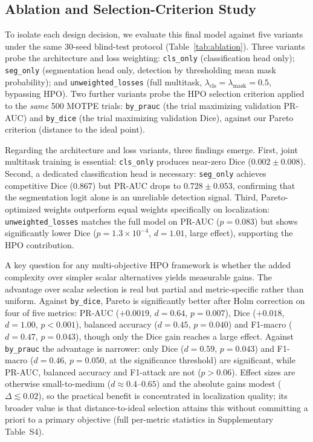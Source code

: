 \documentclass[final,5p,times,twocolumn,number]{elsarticle}
\newcommand{\rev}[1]{#1}
\newcommand{\revB}[1]{#1}
\begin{document}
\subsection{Ablation and Selection-Criterion Study}
\label{subsec:ablation}

To isolate each design decision, we evaluate this final model against five
variants under the same 30-seed blind-test protocol
(Table~\ref{tab:ablation}). Three variants probe the architecture and loss
weighting: \texttt{cls\_only} (classification head only); \texttt{seg\_only}
(segmentation head only, detection by thresholding mean mask probability);
and \texttt{unweighted\_losses} (full multitask, $\lambda_{\text{cls}} =
\lambda_{\text{mask}} = 0.5$, bypassing HPO). \rev{Two further variants probe
the HPO selection criterion applied to the \emph{same} 500 MOTPE trials:
\texttt{by\_prauc} (the trial maximizing validation PR-AUC) and
\texttt{by\_dice} (the trial maximizing validation Dice), against our Pareto
criterion (distance to the ideal point).}

Regarding the architecture and loss variants, three findings emerge.
First, joint multitask training is essential:
\texttt{cls\_only} produces near-zero Dice ($0.002 \pm 0.008$). Second, a
dedicated classification head is necessary: \texttt{seg\_only} achieves
competitive Dice ($0.867$) but PR-AUC drops to $0.728 \pm 0.053$, confirming
that the segmentation logit alone is an unreliable detection signal. Third,
Pareto-optimized weights outperform equal weights specifically on localization:
\texttt{unweighted\_losses} matches the full model on PR-AUC ($p = 0.083$) but
shows significantly lower Dice ($p = 1.3 \times 10^{-4}$, $d = 1.01$, large
effect), supporting the HPO contribution.

A key question for any multi-objective HPO framework is whether the added
complexity over simpler scalar alternatives yields measurable gains. \revB{The
advantage over scalar selection is real but partial and metric-specific rather
than uniform. Against \texttt{by\_dice}, Pareto is significantly better after Holm
correction on four of five metrics: PR-AUC ($+0.0019$, $d=0.64$, $p=0.007$), Dice
($+0.018$, $d=1.00$, $p<0.001$), balanced accuracy ($d=0.45$, $p=0.040$) and
F1-macro ($d=0.47$, $p=0.043$), though only the Dice gain reaches a large effect.
Against \texttt{by\_prauc} the advantage is narrower: only Dice ($d=0.59$,
$p=0.043$) and F1-macro ($d=0.46$, $p=0.050$, at the significance threshold) are
significant, while PR-AUC, balanced accuracy and F1-attack are not ($p>0.06$).
Effect sizes are otherwise small-to-medium ($d\approx0.4$--$0.65$) and the
absolute gains modest ($\Delta\lesssim0.02$), so the practical benefit is
concentrated in localization quality; its broader value is that distance-to-ideal
selection attains this without committing a priori to a primary objective (full
per-metric statistics in Supplementary Table~S4).}
\end{document}
